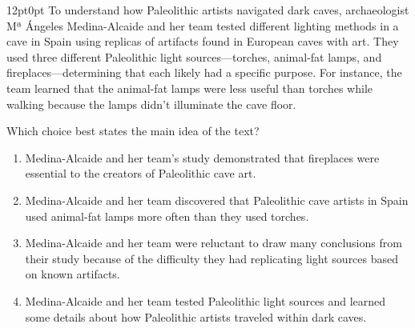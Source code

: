 \documentclass[11pt, twocolumn]{article}
\newcounter{questionnum}
\begin{document}
\vspace{6pt}\noindent
\begin{minipage}{\columnwidth}\raggedright
\noindent{}\par\vspace{8pt}
\begin{adjustwidth}{12pt}{0pt}
To understand how Paleolithic artists navigated dark caves, archaeologist Mª Ángeles Medina-Alcaide and her team tested different lighting methods in a cave in Spain using replicas of artifacts found in European caves with art. They used three different Paleolithic light sources---torches, animal-fat lamps, and fireplaces---determining that each likely had a specific purpose. For instance, the team learned that the animal-fat lamps were less useful than torches while walking because the lamps didn't illuminate the cave floor.
\vspace{6pt}

Which choice best states the main idea of the text?
\begin{enumerate}[label=\Alph*),leftmargin=18pt,topsep=3pt,itemsep=2pt]
  \item Medina-Alcaide and her team's study demonstrated that fireplaces were essential to the creators of Paleolithic cave art.
  \item Medina-Alcaide and her team discovered that Paleolithic cave artists in Spain used animal-fat lamps more often than they used torches.
  \item Medina-Alcaide and her team were reluctant to draw many conclusions from their study because of the difficulty they had replicating light sources based on known artifacts.
  \item Medina-Alcaide and her team tested Paleolithic light sources and learned some details about how Paleolithic artists traveled within dark caves.
\end{enumerate}
\end{adjustwidth}
\end{minipage}\par
\end{document}
